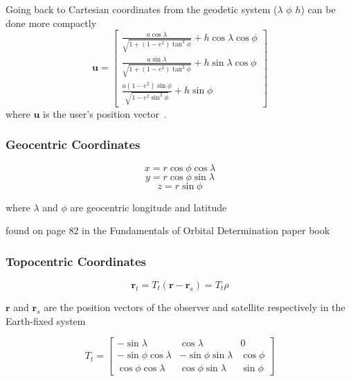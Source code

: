
Going back to Cartesian coordinates from the geodetic system ($\lambda$ $\phi$ $h$) can be done more compactly
\[ \mathbf{u} = \left[  \begin{array}{c}
\frac{a\cos\lambda}{\sqrt{1+(1-e^2)\tan^{2}\phi}}+h\cos\lambda\cos\phi \\
\frac{a\sin\lambda}{\sqrt{1+(1-e^2)\tan^{2}\phi}}+h\sin\lambda\cos\phi \\
\frac{a(1-e^{2})\sin\phi}{\sqrt{1-e^{2}\sin^{2}\phi}}+h\sin\phi
\end{array}
\right] \]
where $\mathbf{u}$ is the user's position vector~\cite[pp. 26-28, p. 76]{kaplan:ugpspa,me:gsmp}.

\subsubsection{Geocentric Coordinates}
\[x=r\cos\phi\cos\lambda\]
\[y=r\cos\phi\sin\lambda\]
\[z=r\sin\phi\]

where $\lambda$ and $\phi$ are geocentric longitude and latitude

found on page 82 in the Fundamentals of Orbital Determination paper book


\subsubsection{Topocentric Coordinates}
\[\mathbf{r}_{t}=T_{t}(\mathbf{r}-\mathbf{r}_{s})=T_{t}\rho\]

$\mathbf{r}$ and $\mathbf{r}_{s}$ are the position vectors of the observer and satellite respectively in the Earth-fixed system

\[T_{t}=\left[ \begin{array}{ccc}
-\sin\lambda & \cos\lambda & 0 \\
-\sin\phi\cos\lambda & -\sin\phi\sin\lambda & \cos\phi \\
\cos\phi\cos\lambda & \cos\phi\sin\lambda & \sin\phi \end{array} \right] \]

